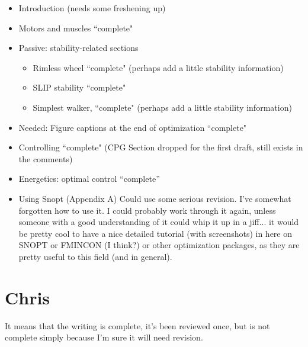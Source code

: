 \begin{itemize}
\item Introduction (needs some freshening up)
\item Motors and muscles ``complete"

\item Passive: stability-related sections
\begin{itemize}
\item Rimless wheel ``complete" (perhaps add a little stability information)
\item SLIP stability ``complete"
\item Simplest walker, ``complete" (perhaps add a little stability information)
\end{itemize}

\item Needed: Figure captions at the end of optimization ``complete"

\item Controlling ``complete" (CPG Section dropped for the first draft, still exists in the comments)
\item Energetics: optimal control ``complete''

\item Using Snopt (Appendix A) Could use some serious revision. I've somewhat forgotten how to use it. I could probably work through it again, unless someone with a good understanding of it could whip it up in a jiff... it would be pretty cool to have a nice detailed tutorial (with screenshots) in here on SNOPT or FMINCON (I think?) or other optimization packages, as they are pretty useful to this field (and in general). 

\end{itemize}

\section*{Chris}

It means that the writing is complete, it's been reviewed once, but is not complete simply because I'm sure it will need revision.

